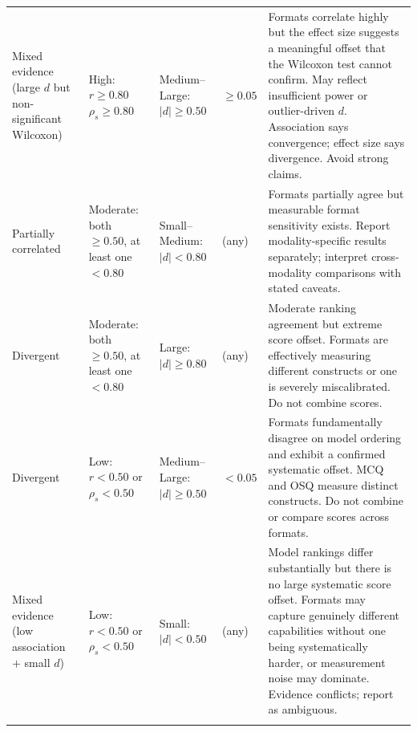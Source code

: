 \begin{table}[htbp]
{\begin{tabular}{p{3.1cm} p{2.8cm} p{2.4cm} p{2.0cm} p{8.7cm}}
Mixed evidence (large $d$ but non-significant Wilcoxon) &
\makecell[l]{High:\\ $r \ge 0.80$\\ $\rho_s \ge 0.80$} &
\makecell[l]{Medium--Large:\\ $|d| \ge 0.50$} &
$\ge 0.05$ &
Formats correlate highly but the effect size suggests a meaningful offset that the Wilcoxon test cannot confirm. May reflect insufficient power or outlier-driven $d$. Association says convergence; effect size says divergence. Avoid strong claims. \\
\addlinespace

Partially correlated &
\makecell[l]{Moderate:\\ both $\ge 0.50$,\\ at least one $< 0.80$} &
\makecell[l]{Small--Medium:\\ $|d| < 0.80$} &
(any) &
Formats partially agree but measurable format sensitivity exists. Report modality-specific results separately; interpret cross-modality comparisons with stated caveats. \\
\addlinespace

Divergent &
\makecell[l]{Moderate:\\ both $\ge 0.50$,\\ at least one $< 0.80$} &
\makecell[l]{Large:\\ $|d| \ge 0.80$} &
(any) &
Moderate ranking agreement but extreme score offset. Formats are effectively measuring different constructs or one is severely miscalibrated. Do not combine scores. \\
\addlinespace

Divergent &
\makecell[l]{Low:\\ $r < 0.50$\\ or $\rho_s < 0.50$} &
\makecell[l]{Medium--Large:\\ $|d| \ge 0.50$} &
$< 0.05$ &
Formats fundamentally disagree on model ordering and exhibit a confirmed systematic offset. MCQ and OSQ measure distinct constructs. Do not combine or compare scores across formats. \\
\addlinespace

Mixed evidence (low association $+$ small $d$) &
\makecell[l]{Low:\\ $r < 0.50$\\ or $\rho_s < 0.50$} &
\makecell[l]{Small:\\ $|d| < 0.50$} &
(any) &
Model rankings differ substantially but there is no large systematic score offset. Formats may capture genuinely different capabilities without one being systematically harder, or measurement noise may dominate. Evidence conflicts; report as ambiguous. \\
\addlinespace


\end{tabular}}
\end{table}
